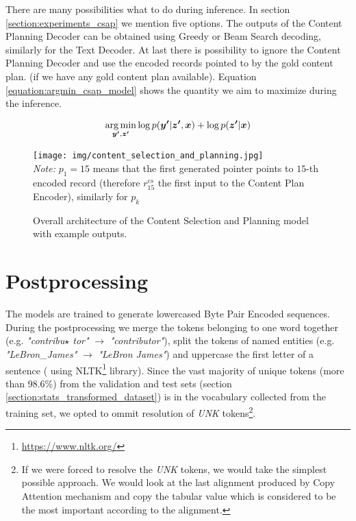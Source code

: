 There are many possibilities what to do during inference. In section \ref{section:experiments_csap} we mention five options. The outputs of the Content Planning Decoder can be obtained using Greedy or Beam Search decoding, similarly for the Text Decoder. At last there is possibility to ignore the Content Planning Decoder and use the encoded records pointed to by the gold content plan. (if we have any gold content plan available). Equation \ref{equation:argmin_csap_model} shows the quantity we aim to maximize during the inference.

\begin{equation} \label{equation:argmin_csap_model}
    \operatorname*{arg\,min}_{\boldsymbol{y'}, \boldsymbol{z'}}{\log{p(\boldsymbol{y'}|\boldsymbol{z'}, \boldsymbol{x})} + \log{p(\boldsymbol{z'} | \boldsymbol{x})}}
\end{equation}

\begin{figure}[!h]
    \centering
    \texttt{[image: img/content\_selection\_and\_planning.jpg]}
    \footnotesize{\\ \textit{Note:} $p_1 = 15$ means that the first generated pointer points to $15$-th encoded record (therefore $r^{cs}_{15}$ the first input to the Content Plan Encoder), similarly for $p_{k}$}
    \caption{Overall architecture of the Content Selection and Planning model with example outputs.} \label{figure:overal_architecture_csap}
\end{figure}

\section{Postprocessing}

The models are trained to generate lowercased Byte Pair Encoded sequences. During the postprocessing we merge the tokens belonging to one word together (e.g. \emph{"contribu$\star$ tor"} $\rightarrow$ \emph{"contributor"}), split the tokens of named entities (e.g. \emph{"LeBron\_James"} $\rightarrow$ \emph{"LeBron James"}) and uppercase the first letter of a sentence ( using NLTK\footnote{\url{https://www.nltk.org/}} library). Since the vast majority of unique tokens (more than 98.6\%) from the validation and test sets (section \ref{section:stats_transformed_dataset}) is in the vocabulary collected from the training set, we opted to ommit resolution of \emph{UNK} tokens\footnote{If we were forced to resolve the \emph{UNK} tokens, we would take the simplest possible approach. We would look at the last alignment produced by Copy Attention mechanism and copy the tabular value which is considered to be the most important according to the alignment. }.